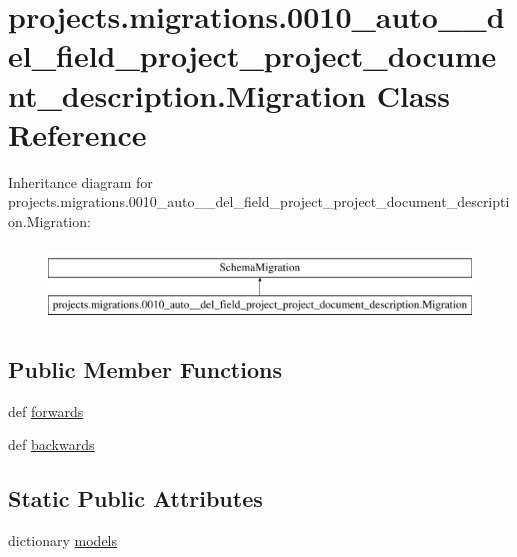 \hypertarget{classprojects_1_1migrations_1_10010__auto____del__field__project__project__document__description_1_1_migration}{\section{projects.\-migrations.0010\-\_\-auto\-\_\-\-\_\-del\-\_\-field\-\_\-project\-\_\-project\-\_\-document\-\_\-description.Migration Class Reference}
\label{classprojects_1_1migrations_1_10010__auto____del__field__project__project__document__description_1_1_migration}
}
Inheritance diagram for projects.\-migrations.0010\-\_\-auto\-\_\-\-\_\-del\-\_\-field\-\_\-project\-\_\-project\-\_\-document\-\_\-description.Migration\-:\begin{figure}[H]
\begin{center}
\leavevmode
\includegraphics[height=2.000000cm]{classprojects_1_1migrations_1_10010__auto____del__field__project__project__document__description_1_1_migration}
\end{center}
\end{figure}
\subsection*{Public Member Functions}
\begin{DoxyCompactItemize}
\item 
def \hyperlink{classprojects_1_1migrations_1_10010__auto____del__field__project__project__document__description_1_1_migration_a0c078d478430dea1346a5b2ee88eabc4}{forwards}
\item 
def \hyperlink{classprojects_1_1migrations_1_10010__auto____del__field__project__project__document__description_1_1_migration_a30990a9a85f43945091db288076d7059}{backwards}
\end{DoxyCompactItemize}
\subsection*{Static Public Attributes}
\begin{DoxyCompactItemize}
\item 
dictionary \hyperlink{classprojects_1_1migrations_1_10010__auto____del__field__project__project__document__description_1_1_migration_a85884e9b892b3d9d792b8f966c7f9090}{models}
\end{DoxyCompactItemize}


